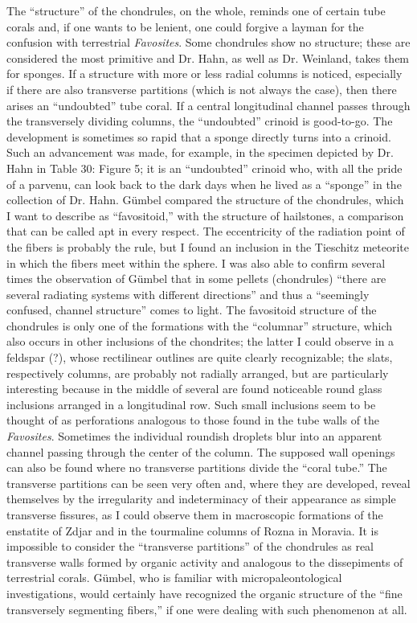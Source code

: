 \documentclass[a4paper, 12pt, oneside]{article}
\begin{document}
The ``structure'' of the chondrules, on the whole, reminds one of certain tube corals and, if one wants to be lenient, one could forgive a layman for the confusion with terrestrial \emph{Favosites}. Some chondrules show no structure; these are considered the most primitive and Dr. Hahn, as well as Dr. Weinland, takes them for sponges. If a structure with more or less radial columns is noticed, especially if there are also transverse partitions (which is not always the case), then there arises an ``undoubted'' tube coral. If a central longitudinal channel passes through the transversely dividing columns, the ``undoubted'' crinoid is good-to-go. The development is sometimes so rapid that a sponge directly turns into a crinoid. Such an advancement was made, for example, in the specimen depicted by Dr. Hahn in Table 30: Figure 5; it is an ``undoubted'' crinoid who, with all the pride of a parvenu, can look back to the dark days when he lived as a ``sponge'' in the collection of Dr. Hahn. Gümbel compared the structure of the chondrules, which I want to describe as ``favositoid,'' with the structure of hailstones, a comparison that can be called apt in every respect. The eccentricity of the radiation point of the fibers is probably the rule, but I found an inclusion in the Tieschitz meteorite in which the fibers meet within the sphere. I was also able to confirm several times the observation of Gümbel that in some pellets (chondrules) ``there are several radiating systems with different directions'' and thus a ``seemingly confused, channel structure'' comes to light. The favositoid structure of the chondrules is only one of the formations with the ``columnar'' structure, which also occurs in other inclusions of the chondrites; the latter I could observe in a feldspar (?), whose rectilinear outlines are quite clearly recognizable; the slats, respectively columns, are probably not radially arranged, but are particularly interesting because in the middle of several are found noticeable round glass inclusions arranged in a longitudinal row. Such small inclusions seem to be thought of as perforations analogous to those found in the tube walls of the \emph{Favosites}. Sometimes the individual roundish droplets blur into an apparent channel passing through the center of the column. The supposed wall openings can also be found where no transverse partitions divide the ``coral tube.'' The transverse partitions can be seen very often and, where they are developed, reveal themselves by the irregularity and indeterminacy of their appearance as simple transverse fissures, as I could observe them in macroscopic formations of the enstatite of Zdjar and in the tourmaline columns of Rozna in Moravia. It is impossible to consider the ``transverse partitions'' of the chondrules as real transverse walls formed by organic activity and analogous to the dissepiments of terrestrial corals. Gümbel, who is familiar with micropaleontological investigations, would certainly have recognized the organic structure of the ``fine transversely segmenting fibers,'' if one were dealing with such phenomenon at all.
\end{document}
